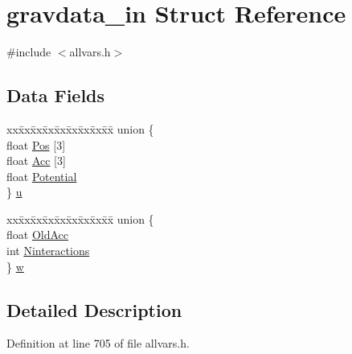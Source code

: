 \hypertarget{structgravdata__in}{
\section{gravdata\_\-in Struct Reference}
\label{structgravdata__in}
}


{\ttfamily \#include $<$allvars.h$>$}

\subsection*{Data Fields}
\begin{DoxyCompactItemize}
\item 
\begin{tabbing}
xx\=xx\=xx\=xx\=xx\=xx\=xx\=xx\=xx\=\kill
union \{\\
\>float \hyperlink{structgravdata__in_a8cac0f094027f8638152ecdcf11f1e92}{Pos} \mbox{[}3\mbox{]}\\
\>float \hyperlink{structgravdata__in_a6850a5b240d113f9c28c27762d3c44ff}{Acc} \mbox{[}3\mbox{]}\\
\>float \hyperlink{structgravdata__in_ac003758a6c6e72bb9cc1ce619fabf148}{Potential}\\
\} \hyperlink{structgravdata__in_a89df6fdf4fb1512fa2b491eb4fb10662}{u}\\

\end{tabbing}\item 
\begin{tabbing}
xx\=xx\=xx\=xx\=xx\=xx\=xx\=xx\=xx\=\kill
union \{\\
\>float \hyperlink{structgravdata__in_aba8345d83e2a1512a83563dbd87c9a3f}{OldAcc}\\
\>int \hyperlink{structgravdata__in_a6b47f6ca387f17b375c949bbc9c0572f}{Ninteractions}\\
\} \hyperlink{structgravdata__in_aa49666c565d68dcd6c3b6a6015f8a51f}{w}\\

\end{tabbing}\end{DoxyCompactItemize}


\subsection{Detailed Description}


Definition at line 705 of file allvars.h.



